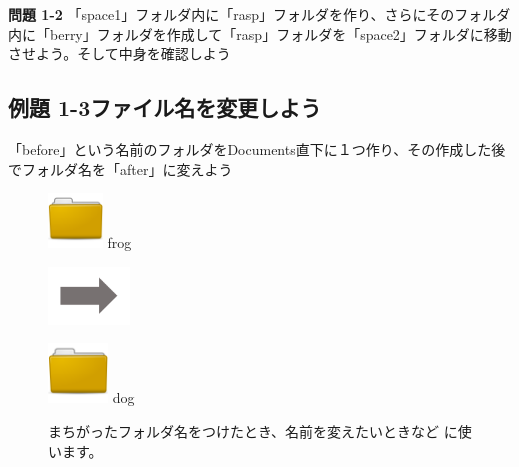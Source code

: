 \documentclass[a4paper,12pt]{jarticle}
\begin{document}
{\bfseries 問題 1-2}
「space1」フォルダ内に「rasp」フォルダを作り、さらにそのフォルダ内に「berry」フォルダを作成して「rasp」フォルダを「space2」フォルダに移動させよう。そして中身を確認しよう



\clearpage\subsection{例題 1-3ファイル名を変更しよう}
「before」という名前のフォルダをDocuments直下に１つ作り、その作成した後でフォルダ名を「after」に変えよう

\begin{figure}[ht]

  \centering
  \begin{minipage}{1.978cm}
    \includegraphics[width=1.45cm,height=1.45cm]{textbook-img044.png}
    frog
  \end{minipage}
  \includegraphics[width=2.168cm,height=1.542cm]{textbook-img052.png}
  \begin{minipage}{1.978cm}
    \includegraphics[width=1.588cm,height=1.588cm]{textbook-img044.png}
    dog
  \end{minipage}
  \begin{minipage}{6.319cm}
    まちがったフォルダ名をつけたとき、名前を変えたいときなど
    に使います。
  \end{minipage}


\end{figure}
\end{document}
